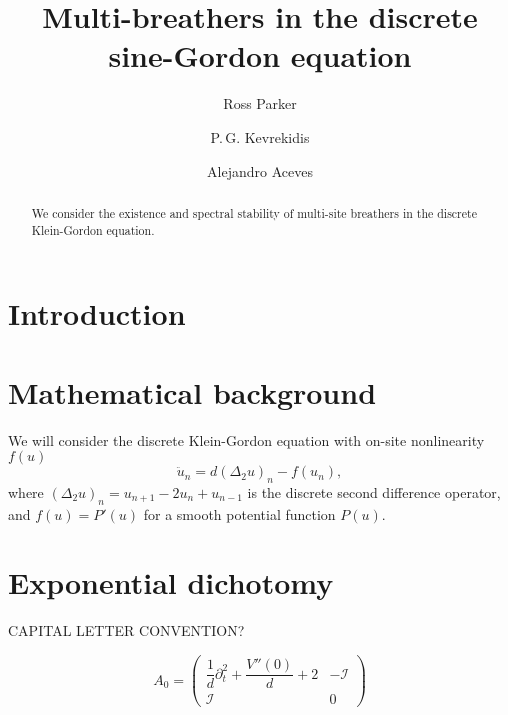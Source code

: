 \documentclass[12pt,reqno]{amsart}
\def\id{{\mathcal I}}
\begin{document}
\title{Multi-breathers in the discrete sine-Gordon equation}

\author{Ross Parker}
\address{Department of Mathematics, Southern Methodist University, 
Dallas, TX 75275, USA}

\author{P.\,G. Kevrekidis} 
\address{Department of Mathematics and Statistics, University of Massachusetts, Amherst MA 01003, USA}

\author{Alejandro Aceves}
\address{Department of Mathematics, Southern Methodist University, 
Dallas, TX 75275, USA}

\begin{abstract}
	We consider the existence and spectral stability of multi-site breathers in the discrete Klein-Gordon equation.
\end{abstract}

\maketitle

\section{Introduction}

\section{Mathematical background}\label{sec:bg}

We will consider the discrete Klein-Gordon equation with on-site nonlinearity $f(u)$
\begin{equation}\label{eq:KG}
\ddot{u}_n = d (\Delta_2 u)_n - f(u_n),
\end{equation}
where $(\Delta_2 u)_n = u_{n+1} - 2 u_n + u_{n-1}$ is the discrete second difference operator, and $f(u) = P'(u)$ for a smooth potential function $P(u)$. 

\section{Exponential dichotomy}

CAPITAL LETTER CONVENTION?

\begin{equation}\label{eq:A0}
A_0 = \begin{pmatrix}
\dfrac{1}{d}\partial_t^2 + \dfrac{V''(0)}{d} + 2 & -\id \\ \id & 0
\end{pmatrix}
\end{equation}
\end{document}
